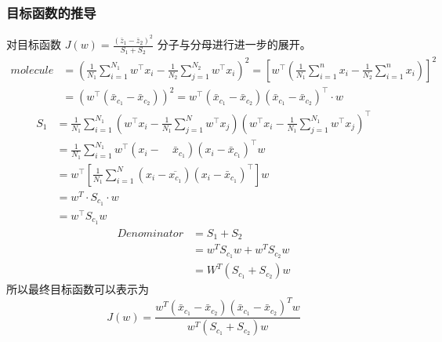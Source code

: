 \documentclass[11pt]{article}
\begin{document}
\subsubsection{目标函数的推导}
\label{sec:orgc8a40ea}
对目标函数 \(J \left( w \right) = \frac{ \left( \bar{z}_1 - \bar{z}_2 \right)^2}{S_1 + S_2}\) 分子与分母进行进一步的展开。
           \begin{equation}
\label{eq:8}
\begin{aligned}
molecule &=\left(\frac{1}{N_{1}} \sum_{i=1}^{N_1} w^{\top} x_{i}-\frac{1}{N_{2}} \sum_{j=1}^{N_{2}} w^{\top} x_{i}\right)^2=\left[w^{\top}\left(\frac{1}{N_{1}} \sum_{i=1}^{n} x_{i}-\frac{1}{N_{2}} \sum_{i=1}^{n} x_{i}\right)\right]^2\\
&=\left(w^{\top}\left(\bar{x}_{c_1}-\bar{x}_{c_{2}}\right)\right)^{2}=w^{\top}\left(\bar{x}_{c_1}-\bar{x}_{c_{2}}\right)\left(\bar{x}_{c_{1}}-\bar{x}_{c_{2}}\right)^{\top} \cdot w
\end{aligned}
\end{equation}
\begin{equation}
\label{eq:9}
\begin{aligned}
S_{1} &=\frac{1}{N_{1}} \sum_{i=1}^{N_{1}}\left(w^{\top} x_{i}-\frac{1}{N_{1}} \sum_{j=1}^{N} w^{\top} x_{j}\right)\left(w^{\top} x_{i}-\frac{1}{N_{1}} \sum_{j=1}^{N_{1}} w^{\top} x_{j}\right)^{\top} \\
&=\frac{1}{N_{1}} \sum_{i=1}^{N_{1}} w^{\top}\left(x_{i}-\quad \bar{x}_{c_{1}}\right)\left(x_{i}-\bar{x}_{c_1}\right)^{\top} w \\
&=w^{\top}\left[\frac{1}{N_{1}} \sum_{i=1}^{N}\left(x_{i}-\overline{x_{c_1}}\right)\left(x_{i}-\bar{x}_{c_1}\right)^{\top}\right] w \\
&=w^{T} \cdot S_{c_{1}} \cdot w \\
&=w^{\top} S_{c_{1}} w
\end{aligned}
\end{equation}
\begin{equation}
\label{eq:10}
\begin{align}
Denominator &= S_1 + S_2\\ 
&= w^T S_{c_1} w + w^T S_{c_2} w \\
&= W^T \left( S_{c_1} + S_{c_2} \right) w
\end{align}
\end{equation}
所以最终目标函数可以表示为
\begin{equation}
\label{eq:12}
J \left( w \right) = \frac{w^T \left( \bar{x}_{c_1} - \bar{x}_{c_2} \right)\left( \bar{x}_{c_1} - \bar{x}_{c_2} \right)^T w}{w^T \left( S_{c_1} + S_{c_2} \right) w}
\end{equation}
\end{document}
